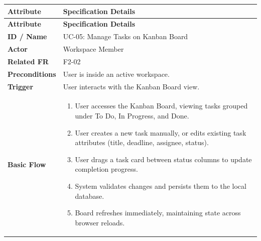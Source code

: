 \begin{longtable}{>{\raggedright\arraybackslash}p{}>{\raggedright\arraybackslash}p{}}

\hline

\rowcolor{tablehead}

\textbf{Attribute} & \textbf{Specification Details} \\ \hline

\endfirsthead

\hline

\rowcolor{tablehead}

\textbf{Attribute} & \textbf{Specification Details} \\ \hline

\endhead

\endfoot

\endlastfoot

\textbf{ID / Name} & UC-05: Manage Tasks on Kanban Board \\ \hline

\textbf{Actor} & Workspace Member \\ \hline

\textbf{Related FR} & F2-02 \\ \hline

\textbf{Preconditions} & User is inside an active workspace. \\ \hline

\textbf{Trigger} & User interacts with the Kanban Board view. \\ \hline

\textbf{Basic Flow} & \begin{enumerate}[nosep,leftmargin=*,label=\arabic*.]

    \item User accesses the Kanban Board, viewing tasks grouped under To Do, In Progress, and Done.

    \item User creates a new task manually, or edits existing task attributes (title, deadline, assignee, status).

    \item User drags a task card between status columns to update completion progress.

    \item System validates changes and persists them to the local database.

    \item Board refreshes immediately, maintaining state across browser reloads.


\end{enumerate}
\end{longtable}
